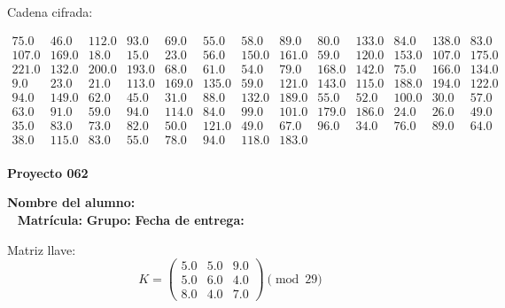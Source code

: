 \documentclass[12pt]{article}
\begin{document}
Cadena cifrada:
\begin{center}
$\begin{array}{lllllllllllll}
75.0 & 46.0 & 112.0 & 93.0 & 69.0 & 55.0 & 58.0 & 89.0 & 80.0 & 133.0 & 84.0 & 138.0 & 83.0\\
107.0 & 169.0 & 18.0 & 15.0 & 23.0 & 56.0 & 150.0 & 161.0 & 59.0 & 120.0 & 153.0 & 107.0 & 175.0\\
221.0 & 132.0 & 200.0 & 193.0 & 68.0 & 61.0 & 54.0 & 79.0 & 168.0 & 142.0 & 75.0 & 166.0 & 134.0\\
9.0 & 23.0 & 21.0 & 113.0 & 169.0 & 135.0 & 59.0 & 121.0 & 143.0 & 115.0 & 188.0 & 194.0 & 122.0\\
94.0 & 149.0 & 62.0 & 45.0 & 31.0 & 88.0 & 132.0 & 189.0 & 55.0 & 52.0 & 100.0 & 30.0 & 57.0\\
63.0 & 91.0 & 59.0 & 94.0 & 114.0 & 84.0 & 99.0 & 101.0 & 179.0 & 186.0 & 24.0 & 26.0 & 49.0\\
35.0 & 83.0 & 73.0 & 82.0 & 50.0 & 121.0 & 49.0 & 67.0 & 96.0 & 34.0 & 76.0 & 89.0 & 64.0\\
38.0 & 115.0 & 83.0 & 55.0 & 78.0 & 94.0 & 118.0 & 183.0\\
\end{array}$
\end{center}

\newpage


\textbf{Proyecto 062}

\textbf{Nombre del alumno:} \underline{\hspace{13cm}}\\\
\vspace{1cm}
\textbf{Matrícula:} \underline{\hspace{4cm}} \hspace{1cm}
\textbf{Grupo:} \underline{\hspace{2cm}}
\textbf{Fecha de entrega:} \underline{\hspace{2cm}}

\medskip

Matriz llave:
\[
K = \begin{pmatrix}
5.0 & 5.0 & 9.0\\
5.0 & 6.0 & 4.0\\
8.0 & 4.0 & 7.0
\end{pmatrix} \pmod{29}
\]
\end{document}
